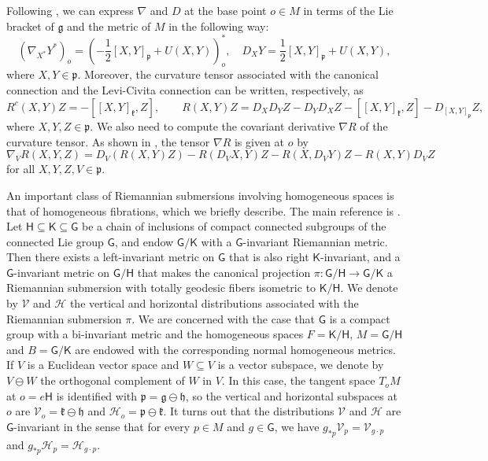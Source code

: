 \documentclass[11pt,a4paper,final]{amsart}
\newcommand{\s}{\mathsf}
\newcommand{\g}{\mathfrak}
\theoremstyle{definition}
\begin{document}
Following \cite[Chapter X]{KobayashiNomizu2}, we can express $\nabla$ and $D$ at the base point $o\in M$ in terms of the Lie bracket of $\g{g}$ and the metric of $M$ in the following way:
\begin{equation*}
	(\nabla_{X^*} Y^*)_o=\left(-\frac{1}{2}[X,Y]_{\g{p}} + U(X,Y) \right)^*_o, \quad
	D_X Y=\frac{1}{2}[X,Y]_{\g{p}}+ U(X,Y),
\end{equation*}
where $X,Y\in\g{p}$. 
Moreover,  the curvature tensor associated with the canonical connection and the Levi-Civita connection can be written, respectively,  as
\begin{equation*}
	R^c(X,Y)Z=-[[X,Y]_{\g{k}},Z], \qquad 					
	R(X,Y)Z=D_X D_Y Z-D_Y D_X Z-[[X,Y]_{\g{k}},Z]-D_{[X,Y]_{\g{p}}}Z,
\end{equation*}
where $X,Y,Z\in \g{p}$.
We also need to compute the covariant derivative $\nabla R$ of the curvature tensor.
As shown in \cite[Remark~2.5]{RodriguezVazquezOlmos}, the tensor $\nabla R$ is given at $o$ by
\begin{equation*}
	\nabla_{V}R(X,Y,Z)=D_V(R(X,Y)Z)-R(D_V X,Y)Z-R(X,D_V Y)Z-R(X,Y)D_V Z
\end{equation*}
for all $X,Y,Z,V\in\g{p}$.
	
An important class of Riemannian submersions involving homogeneous spaces is that of homogeneous fibrations, which we briefly describe.
The main reference is \cite{GromollWalschap}.
Let $\s{H}\subseteq \s{K}\subseteq \s{G}$ be a chain of inclusions of compact connected subgroups of the connected Lie group $\s{G}$, and endow $\s{G}/\s{K}$ with a $\s{G}$-invariant Riemannian metric.
Then there exists a left-invariant metric on $\s{G}$ that is also right $\s{K}$-invariant, and a $\s{G}$-invariant metric on $\s{G}/\s{H}$ that makes the canonical projection $\pi\colon\s{G}/\s{H}\to\s{G}/\s{K}$ a Riemannian submersion with totally geodesic fibers isometric to $\s{K}/\s{H}$.
We denote by $\mathcal{V}$ and $\mathcal{H}$ the vertical and horizontal distributions associated with the Riemannian submersion $\pi$. 
We are concerned with the case that $\s{G}$ is a compact group with a bi-invariant metric and the homogeneous spaces $F=\s{K}/\s{H}$, $M=\s{G}/\s{H}$ and $B=\s{G}/\s{K}$ are endowed with the corresponding normal homogeneous metrics.
If $V$ is a Euclidean vector space and $W\subseteq V$ is a vector subspace, we denote by $V\ominus W$ the orthogonal complement of $W$ in $V$.
In this case, the tangent space $T_{o}M$ at $o=e\s{H}$ is identified with $\g{p}=\g{g}\ominus\g{h}$, so the vertical and horizontal subspaces at $o$ are $\mathcal{V}_{o}=\g{k}\ominus\g{h}$ and $\mathcal{H}_{o}=\g{p}\ominus \g{k}$.
It turns out that the distributions $\mathcal{V}$ and $\mathcal{H}$ are $\s{G}$-invariant in the sense that for every $p\in M$ and $g\in \s{G}$, we have $g_{*p}\mathcal{V}_{p}=\mathcal{V}_{g\cdot p}$ and $g_{*p}\mathcal{H}_{p}=\mathcal{H}_{g\cdot p}$.
	
\end{document}
